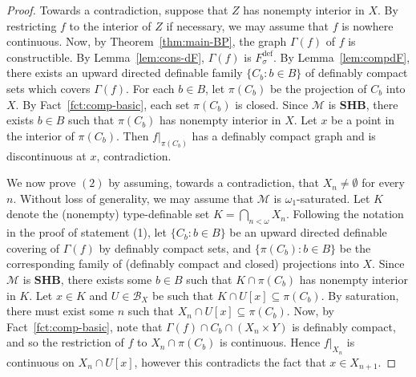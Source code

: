 \documentclass[12pt]{article}
\newcommand{\Bb}{\mathcal{B}}
\newcommand{\Mm}{\mathcal{M}}
\newcommand{\dF}{\ensuremath{F_\sigma^{\text{def}}}}
\newcommand{\BP}{\textbf{SHB}}
\newcommand{\BU}{\Bb} %
\theoremstyle{definition}
\theoremstyle{remark}
\begin{document}
\begin{proof}
Towards a contradiction, suppose that $Z$ has nonempty interior in $X$. By restricting $f$ to the interior of $Z$ if necessary, we may assume that $f$ is nowhere continuous. Now, by Theorem~\ref{thm:main-BP}, the graph $\Gamma(f)$ of $f$ is constructible. By Lemma~\ref{lem:cons-dF}, $\Gamma(f)$ is $\dF$. By Lemma~\ref{lem:compdF}, there exists an upward directed definable family $\{C_b : b\in B \}$ of definably compact sets which covers $\Gamma(f)$. For each $b\in B$, let $\pi(C_b)$ be the projection of $C_b$ into $X$. By Fact~\ref{fct:comp-basic}, each set $\pi(C_b)$ is closed. Since $\Mm$ is $\BP$, there exists $b\in B$ such that $\pi(C_b)$ has nonempty interior in $X$. Let $x$ be a point in the interior of $\pi(C_b)$. Then $f|_{\pi(C_b)}$ has a definably compact graph and is discontinuous at $x$, contradiction.

We now prove $(2)$ by assuming, towards a contradiction, that $X_n\neq \emptyset$ for every $n$. Without loss of generality, we may assume that $\Mm$ is $\omega_1$-saturated. Let $K$ denote the (nonempty) type-definable set $K=\bigcap_{n<\omega} X_n$. Following the notation in the proof of statement (1), let $\{C_b : b\in B \}$ be an upward directed definable covering of $\Gamma(f)$ by definably compact sets, and $\{\pi(C_b) : b\in B \}$ be the corresponding family of (definably compact and closed) projections into $X$. Since $\Mm$ is $\BP$, there exists some $b\in B$ such that $K\cap \pi(C_b)$ has nonempty interior in $K$. Let $x\in K$ and $U\in \BU_X$ be such that $K\cap U[x] \subseteq \pi(C_b)$. By saturation, there must exist some $n$ such that $X_n\cap U[x] \subseteq \pi(C_b)$. Now, by Fact~\ref{fct:comp-basic}, note that $\Gamma(f)\cap C_b \cap (X_n\times Y)$ is definably compact, and so the restriction of $f$ to $X_{n} \cap \pi(C_b)$ is continuous. Hence $f|_{X_{n}}$ is continuous on $X_{n}\cap U[x]$, however this contradicts the fact that $x\in X_{n+1}$. 
\end{proof}
\end{document}
